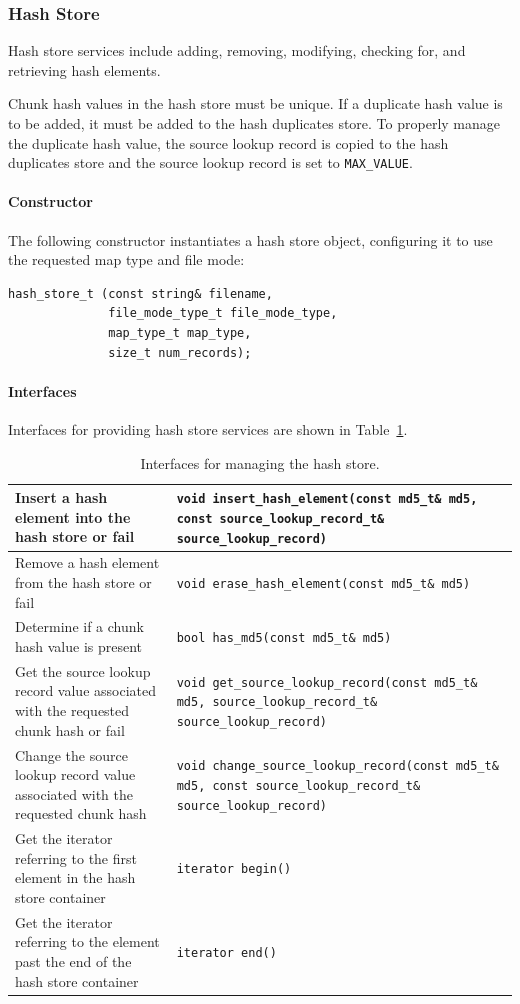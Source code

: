 \documentclass[10pt,twoside]{article}
\begin{document}
\subsubsection{Hash Store}
Hash store services include adding, removing, modifying, checking for,
and retrieving hash elements.

Chunk hash values in the hash store must be unique.
If a duplicate hash value is to be added, it must be added to the hash duplicates store.
To properly manage the duplicate hash value,
the source lookup record is copied to the hash duplicates store
and the source lookup record is set to \texttt{MAX\_VALUE}.

\paragraph{Constructor}
The following constructor instantiates a hash store object,
configuring it to use the requested map type and file mode:
\begin{small}
\begin{verbatim}
hash_store_t (const string& filename,
              file_mode_type_t file_mode_type,
              map_type_t map_type,
              size_t num_records);
\end{verbatim}
\end{small}

\paragraph{Interfaces}
Interfaces for providing hash store services
are shown in Table~\ref{hash-store-interfaces}.
\begin{table}[h]
\center
\begin{tabular}{|p{2in}|p{4in}|}
\hline
Insert a hash element into the hash store or fail & \texttt{void insert\_hash\_element(const md5\_t\& md5, const source\_lookup\_record\_t\& source\_lookup\_record)} \\
\hline
Remove a hash element from the hash store or fail & \texttt{void erase\_hash\_element(const md5\_t\& md5)} \\
\hline
Determine if a chunk hash value is present & \texttt{bool has\_md5(const md5\_t\& md5)} \\
\hline
Get the source lookup record value associated with the requested chunk hash or fail & \texttt{void get\_source\_lookup\_record(const md5\_t\& md5, source\_lookup\_record\_t\& source\_lookup\_record)} \\
\hline
Change the source lookup record value associated with the requested chunk hash & \texttt{void change\_source\_lookup\_record(const md5\_t\& md5, const source\_lookup\_record\_t\& source\_lookup\_record)} \\
\hline
Get the iterator referring to the first element in the hash store container & \texttt{iterator begin()} \\
\hline
Get the iterator referring to the element past the end of the hash store container & \texttt{iterator end()} \\
\hline
\end{tabular}
\caption{Interfaces for managing the hash store.\label{hash-store-interfaces}}
\end{table}
\end{document}
